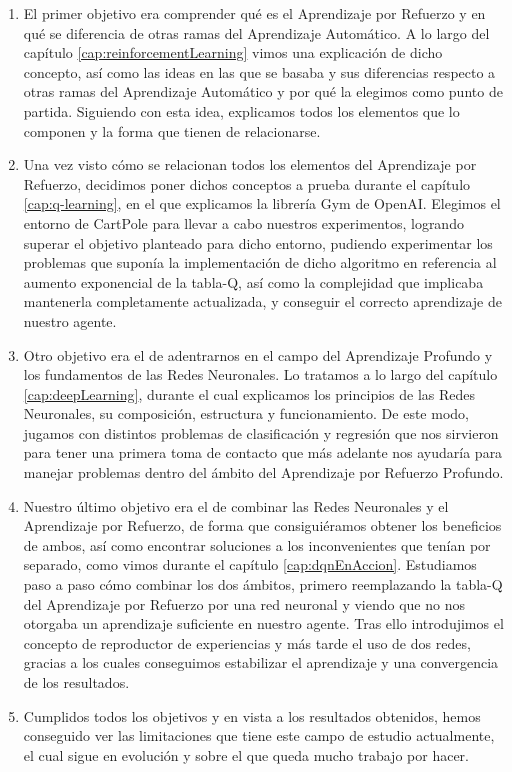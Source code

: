 \begin{enumerate}
        \item El primer objetivo era comprender qué es el Aprendizaje por Refuerzo y en qué se diferencia de otras ramas del Aprendizaje Automático. A lo largo del capítulo \ref{cap:reinforcementLearning} vimos una explicación de dicho concepto, así como las ideas en las que se basaba y sus diferencias respecto a otras ramas del Aprendizaje Automático y por qué la elegimos como punto de partida. Siguiendo con esta idea, explicamos todos los elementos que lo componen y la forma que tienen de relacionarse.
        \item Una vez visto cómo se relacionan todos los elementos del Aprendizaje por Refuerzo, decidimos poner dichos conceptos a prueba durante el capítulo \ref{cap:q-learning}, en el que explicamos la librería Gym de OpenAI. Elegimos el entorno de CartPole para llevar a cabo nuestros experimentos, logrando superar el objetivo planteado para dicho entorno, pudiendo experimentar los problemas que suponía la implementación de dicho algoritmo en referencia al aumento exponencial de la tabla-Q, así como la complejidad que implicaba mantenerla completamente actualizada, y conseguir el correcto aprendizaje de nuestro agente.
        \item Otro objetivo era el de adentrarnos en el campo del Aprendizaje Profundo y los fundamentos de las Redes Neuronales. Lo tratamos a lo largo del capítulo \ref{cap:deepLearning}, durante el cual explicamos los principios de las Redes Neuronales, su composición, estructura y funcionamiento. De este modo, jugamos con distintos problemas de clasificación y regresión que nos sirvieron para tener una primera toma de contacto que más adelante nos ayudaría para manejar problemas dentro del ámbito del Aprendizaje por Refuerzo Profundo.
        \item Nuestro último objetivo era el de combinar las Redes Neuronales y el Aprendizaje por Refuerzo, de forma que consiguiéramos obtener los beneficios de ambos, así como encontrar soluciones a los inconvenientes que tenían por separado, como vimos durante el capítulo \ref{cap:dqnEnAccion}. Estudiamos paso a paso cómo combinar los dos ámbitos, primero reemplazando la tabla-Q del Aprendizaje por Refuerzo por una red neuronal y viendo que no nos otorgaba un aprendizaje suficiente en nuestro agente. Tras ello introdujimos el concepto de reproductor de experiencias y más tarde el uso de dos redes, gracias a los cuales conseguimos estabilizar el aprendizaje y una convergencia de los resultados.
        \item Cumplidos todos los objetivos y en vista a los resultados obtenidos, hemos conseguido ver las limitaciones que tiene este campo de estudio actualmente, el cual sigue en evolución y sobre el que queda mucho trabajo por hacer.
\end{enumerate}

